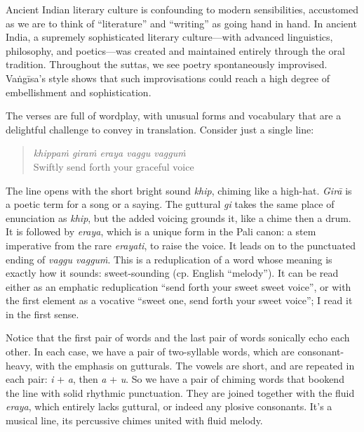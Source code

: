 \documentclass[12pt,openany]{book}%
\begin{document}
Ancient Indian literary culture is confounding to modern sensibilities, accustomed as we are to think of “literature” and “writing” as going hand in hand. In ancient India, a supremely sophisticated literary culture—with advanced linguistics, philosophy, and poetics—was created and maintained entirely through the oral tradition. Throughout the suttas, we see poetry spontaneously improvised. \textsanskrit{Vaṅgīsa}’s style shows that such improvisations could reach a high degree of embellishment and sophistication.

The verses are full of wordplay, with unusual forms and vocabulary that are a delightful challenge to convey in translation. Consider just a single line:

\begin{quotation}%
\textit{\textsanskrit{khippaṁ} \textsanskrit{giraṁ} eraya vaggu \textsanskrit{vagguṁ}} \\
Swiftly send forth your graceful voice

%
\end{quotation}

The line opens with the short bright sound \textit{khip}, chiming like a high-hat. \textit{\textsanskrit{Girā}} is a poetic term for a song or a saying. The guttural \textit{gi} takes the same place of enunciation as \textit{khip}, but the added voicing grounds it, like a chime then a drum. It is followed by \textit{eraya}, which is a unique form in the Pali canon: a stem imperative from the rare \textit{erayati}, to raise the voice. It leads on to the punctuated ending of \textit{vaggu \textsanskrit{vagguṁ}}. This is a reduplication of a word whose meaning is exactly how it sounds: sweet-sounding (cp. English “melody”). It can be read either as an emphatic reduplication “send forth your sweet sweet voice”, or with the first element as a vocative “sweet one, send forth your sweet voice”; I read it in the first sense.

Notice that the first pair of words and the last pair of words sonically echo each other. In each case, we have a pair of two-syllable words, which are consonant-heavy, with the emphasis on gutturals. The vowels are short, and are repeated in each pair: \textit{i} + \textit{a}, then \textit{a} + \textit{u}. So we have a pair of chiming words that bookend the line with solid rhythmic punctuation. They are joined together with the fluid \textit{eraya}, which entirely lacks guttural, or indeed any plosive consonants. It’s a musical line, its percussive chimes united with fluid melody.
\end{document}

